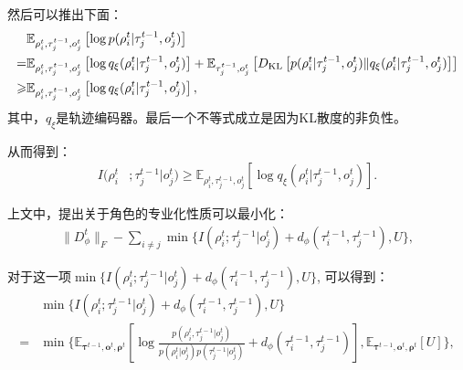 然后可以推出下面：
\begin{equation}
    \begin{aligned}
    &\mathbb{E}_{\rho^{t}_i, \tau^{t-1}_j, o^t_j}\left[\log p(\rho^{t}_i| \tau^{t-1}_j, o^t_j)\right] \\
    =& \mathbb{E}_{\rho^{t}_i, \tau^{t-1}_j, o^t_j}\left[\log q_\xi(\rho^{t}_i| \tau^{t-1}_j, o^t_j)\right] + \mathbb{E}_{\tau^{t-1}_j, o^t_j}\left[D_{\mathrm{KL}}\left[p(\rho^{t}_i| \tau^{t-1}_j, o^t_j) \| q_\xi(\rho^{t}_i| \tau^{t-1}_j, o^t_j) \right]\right] \\
    \geqslant & \mathbb{E}_{\rho^{t}_i, \tau^{t-1}_j, o^t_j}\left[\log q_\xi(\rho^{t}_i| \tau^{t-1}_j, o^t_j)\right]\label{equ:s_lower_bound},
    \end{aligned}
\end{equation}
其中，$q_\xi$是轨迹编码器。最后一个不等式成立是因为KL散度的非负性。

从而得到：
\begin{equation}
    \begin{aligned}
    I(\rho^{t}_i&; \tau^{t-1}_j | o^t_j) \ge \mathbb{E}_{\rho^{t}_i, \tau^{t-1}_j, o^t_j}\left[\log q_\xi(\rho^{t}_i| \tau^{t-1}_j, o^t_j)\right].\label{equ:t1get2}
    \end{aligned}
\end{equation}

上文中，提出关于角色的专业化性质可以最小化：
\begin{equation}
    \begin{aligned}
    \|D_\phi^t\|_{F} - \sum_{i\ne j}\min\{I(\rho^{t}_i; \tau^{t-1}_j|o^t_j) + d_\phi(\tau^{t-1}_i, \tau^{t-1}_j), U\},\label{equ:raw_obj}
    \end{aligned}
\end{equation}

对于这一项$\min\{I(\rho^{t}_i; \tau^{t-1}_j|o^t_j) + d_\phi(\tau^{t-1}_i, \tau^{t-1}_j), U\}$, 可以得到：
\begin{equation}
    \begin{aligned}
    &\min\{I(\rho^{t}_i; \tau^{t-1}_j|o^t_j) + d_\phi(\tau^{t-1}_i, \tau^{t-1}_j), U\} \\ = &\min\{\mathbb{E}_{\bm{\tau}^{t-1}, \bm{o}^t, \bm{\rho}^t}\left[\log\frac{p(\rho^{t}_i, \tau^{t-1}_j | o^t_j)}{p(\rho^{t}_i | o^t_j)p(\tau^{t-1}_j | o^t_j)} + d_\phi(\tau^{t-1}_i, \tau^{t-1}_j)\right], \mathbb{E}_{\bm{\tau}^{t-1}, \bm{o}^t, \bm{\rho}^t}\left[U\right]\},
    \end{aligned}
\end{equation}

